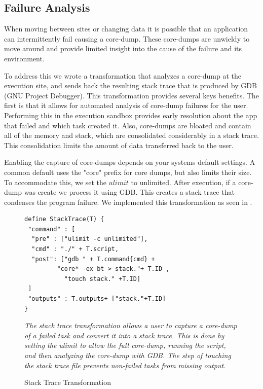 \documentclass[conference]{IEEEtran}
\begin{document}
\subsection{Failure Analysis}

When moving between sites or changing data
it is possible that an application can intermittently
fail causing a core-dump.
These core-dumps are unwieldy to move around and 
provide limited insight into the cause of the failure
and its environment. 

To address this we wrote a transformation that analyzes 
a core-dump at the execution site, and sends back the
resulting stack trace that is produced by GDB (GNU Project Debugger).
This transformation provides several keys benefits.
The first is that it allows for automated analysis of
core-dump failures for the user. Performing this in the 
execution sandbox provides early resolution about the
app that failed and which task created it.
Also, core-dumps are bloated and 
contain all of the memory and stack,
which are consolidated considerably in
a stack trace. 
This consolidation limits the amount of data 
transferred back to the user. 


Enabling the capture of core-dumps depends
on your systems default settings.
A common default uses the "core" prefix for
core dumps, but also limits their size. 
To accommodate this, we set the $ulimit$
to unlimited. After execution, if a 
core-dump was create we process it using GDB.
This creates a stack trace that condenses
the program failure.
We implemented this transformation as 
seen in .

\begin{figure}[h]
\begin{framed}
\begin{verbatim}
define StackTrace(T) {
 "command" : [
  "pre" : ["ulimit -c unlimited"],
  "cmd" : "./" + T.script,
  "post": ["gdb " + T.command{cmd} +
         "core* -ex bt > stack."+ T.ID ,
           "touch stack." +T.ID]
 ]
 "outputs" : T.outputs+ ["stack."+T.ID]
}
\end{verbatim}
\end{framed}
\caption{Stack Trace Transformation}
\small
\emph{The stack trace transformation allows a user
to capture a core-dump of a failed task and 
convert it into a stack trace. 
This is done by setting the ulimit 
to allow the full core-dump, running the script,
and then analyzing the core-dump with GDB.
The step of touching the stack trace
file prevents non-failed tasks from missing output.}
\label{stacktrace}
\end{figure}
\end{document}
